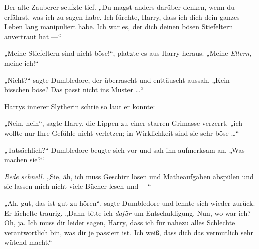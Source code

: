 Der alte Zauberer seufzte tief.
„Du magst anders darüber denken, wenn du erfährst, was ich zu sagen habe. Ich fürchte, Harry, dass ich dich dein ganzes Leben lang manipuliert habe. Ich war es, der dich deinen bösen Stiefeltern anvertraut hat —“

„Meine Stiefeltern sind nicht böse!“, platzte es aus Harry heraus.
„Meine \emph{Eltern}, meine ich!“

„Nicht?“ sagte Dumbledore, der überrascht und enttäuscht aussah.
„Kein bisschen böse? Das passt nicht ins Muster …“

Harrys innerer Slytherin schrie so laut er konnte: \emph{}

„Nein, nein“, sagte Harry, die Lippen zu einer starren Grimasse verzerrt, „ich wollte nur Ihre Gefühle nicht verletzen; in Wirklichkeit sind sie sehr böse …“

„Tatsächlich?“ Dumbledore beugte sich vor und sah ihn aufmerksam an.
„Was machen sie?“

\emph{Rede schnell.}
„Sie, äh, ich muss Geschirr lösen und Matheaufgaben abspülen und sie lassen mich nicht viele Bücher lesen und —“

„Ah, gut, das ist gut zu hören“, sagte Dumbledore und lehnte sich wieder zurück. Er lächelte traurig.
„Dann bitte ich \emph{dafür} um Entschuldigung. Nun, wo war ich? Oh, ja. Ich muss dir leider sagen, Harry, dass ich für nahezu alles Schlechte verantwortlich bin, was dir je passiert ist. Ich weiß, dass dich das vermutlich sehr wütend macht.“

